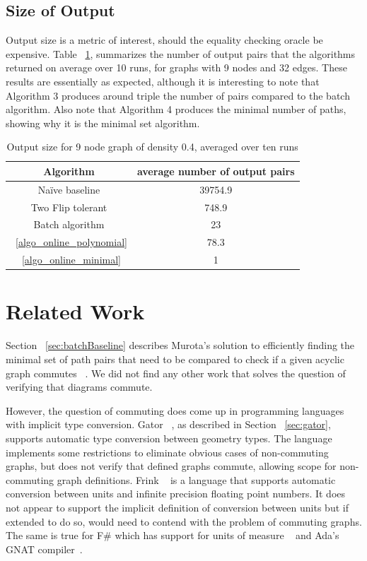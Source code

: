 \documentclass[sigplan,review,nonacm=true]{acmart}
\begin{document}
\subsection{Size of Output}
Output size is a metric of interest, should the equality checking oracle be expensive.
Table ~\ref{tab:sizes}, summarizes the number of output pairs that the algorithms returned on average over 10 runs, for graphs with 9 nodes and 32 edges.
These results are essentially as expected, although it is interesting to note that Algorithm 3 produces around triple the number of pairs compared to the batch algorithm.
Also note that Algorithm 4 produces the minimal number of paths, showing why it is the minimal set algorithm.

\begin{table}
\begin{tabular}{|c|c|}
    \hline
    Algorithm & average number of output pairs \\
    \hline
    Na\"{i}ve baseline & 39754.9 \\
    Two Flip tolerant & 748.9 \\
    Batch algorithm & 23 \\
    ~\ref{algo_online_polynomial} & 78.3 \\
    ~\ref{algo_online_minimal} & 1 \\
    \hline
\end{tabular}
\caption{Output size for 9 node graph of density 0.4, averaged over ten runs}
\label{tab:sizes}
\end{table}

\section{Related Work}

Section ~\ref{sec:batchBaseline} describes Murota's solution to efficiently finding the minimal set of path pairs that need to be compared to check if a given acyclic graph commutes ~\cite{commutative}.
We did not find any other work that solves the question of verifying that diagrams commute.

However, the question of commuting does come up in programming languages with implicit type conversion.
Gator ~\cite{gator}, as described in Section ~\ref{sec:gator}, supports automatic type conversion between geometry types.
The language implements some restrictions to eliminate obvious cases of non-commuting graphs, but does not verify that defined graphs commute, allowing scope for non-commuting graph definitions.
Frink ~\cite{frink} is a language that supports automatic conversion between units and infinite precision floating point numbers.
It does not appear to support the implicit definition of conversion between units  but if extended to do so, would need to contend with the problem of commuting graphs.
The same is true for F\# which has support for units of measure ~\cite{unitsOfMeasure} and Ada's GNAT compiler~\cite{gnat}.
\end{document}
